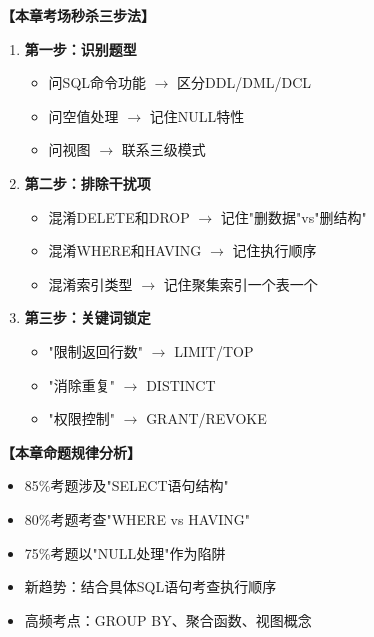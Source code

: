 \documentclass[12pt, a4paper]{article}
\newenvironment{bluebox}[1]{%
  \begin{trivlist}
  \item[\hskip\labelsep \textbf{#1}]
  \setlength{\parskip}{0.5ex}
  \setlength{\itemsep}{0.5ex}
}{%
  \end{trivlist}
}
\begin{document}
\begin{bluebox}{考场秒杀三步法}
	\textbf{【本章考场秒杀三步法】}

	\begin{enumerate}
		\item \textbf{第一步：识别题型}
		      \begin{itemize}
			      \item 问SQL命令功能 $\rightarrow$ 区分DDL/DML/DCL
			      \item 问空值处理 $\rightarrow$ 记住NULL特性
			      \item 问视图 $\rightarrow$ 联系三级模式
		      \end{itemize}

		\item \textbf{第二步：排除干扰项}
		      \begin{itemize}
			      \item 混淆DELETE和DROP $\rightarrow$ 记住"删数据"vs"删结构"
			      \item 混淆WHERE和HAVING $\rightarrow$ 记住执行顺序
			      \item 混淆索引类型 $\rightarrow$ 记住聚集索引一个表一个
		      \end{itemize}

		\item \textbf{第三步：关键词锁定}
		      \begin{itemize}
			      \item "限制返回行数" $\rightarrow$ LIMIT/TOP
			      \item "消除重复" $\rightarrow$ DISTINCT
			      \item "权限控制" $\rightarrow$ GRANT/REVOKE
		      \end{itemize}
	\end{enumerate}
\end{bluebox}

\begin{bluebox}{近年真题规律}
	\textbf{【本章命题规律分析】}

	\begin{itemize}
		\item 85\%考题涉及"SELECT语句结构"
		\item 80\%考题考查"WHERE vs HAVING"
		\item 75\%考题以"NULL处理"作为陷阱
		\item 新趋势：结合具体SQL语句考查执行顺序
		\item 高频考点：GROUP BY、聚合函数、视图概念
	\end{itemize}
\end{bluebox}
\end{document}
